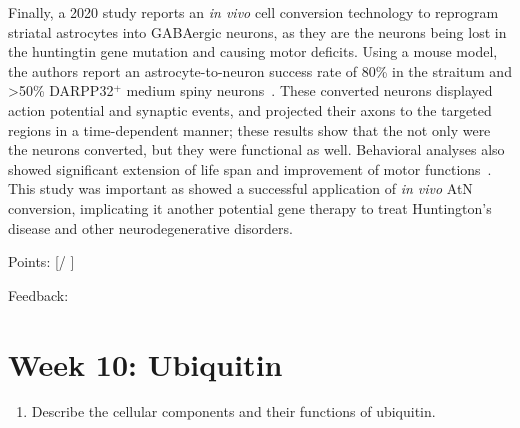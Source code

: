 \documentclass[plain,basic]{inVerba-notes}
\begin{document}
{\begin{enumerate}
\begin{enumerate}
{      Finally, a 2020 study reports an \textit{in vivo} cell conversion technology to reprogram striatal astrocytes into GABAergic neurons, as they are the neurons being lost in the huntingtin gene mutation and causing motor deficits. Using a mouse model, the authors report an astrocyte-to-neuron success rate of 80\% in the straitum and >50\% DARPP32\(^+\) medium spiny neurons~\cite{wu2020gene}. These converted neurons displayed action potential and synaptic events, and projected their axons to the targeted regions in a time-dependent manner; these results show that the not only were the neurons converted, but they were functional as well. Behavioral analyses also showed significant extension of life span and improvement of motor functions~\cite{wu2020gene}. This study was important as showed a successful application of \textit{in vivo} AtN conversion, implicating it another potential gene therapy to treat Huntington's disease and other neurodegenerative disorders.
    }

    Points: [\qquad / \qquad ]

    Feedback: 

    \vspace*{50pt}
  \end{enumerate}

 \end{enumerate}

\newpage
\section{Week 10: Ubiquitin}
\begin{enumerate}
  \item Describe the cellular components and their functions of ubiquitin.
  
\end{enumerate}}
\end{document}
